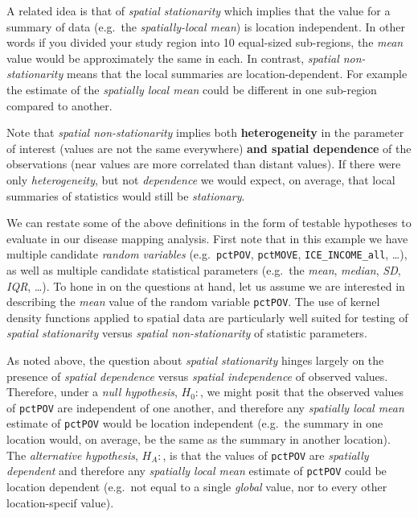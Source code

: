 \documentclass[
]{book}
\begin{document}
A related idea is that of \emph{spatial stationarity} which implies that the value for a summary of data (e.g.~the \emph{spatially-local mean}) is location independent. In other words if you divided your study region into 10 equal-sized sub-regions, the \emph{mean} value would be approximately the same in each. In contrast, \emph{spatial non-stationarity} means that the local summaries are location-dependent. For example the estimate of the \emph{spatially local mean} could be different in one sub-region compared to another.

Note that \emph{spatial non-stationarity} implies both \textbf{heterogeneity} in the parameter of interest (values are not the same everywhere) \textbf{and spatial dependence} of the observations (near values are more correlated than distant values). If there were only \emph{heterogeneity}, but not \emph{dependence} we would expect, on average, that local summaries of statistics would still be \emph{stationary}.

We can restate some of the above definitions in the form of testable hypotheses to evaluate in our disease mapping analysis. First note that in this example we have multiple candidate \emph{random variables} (e.g.~\texttt{pctPOV}, \texttt{pctMOVE}, \texttt{ICE\_INCOME\_all}, \ldots), as well as multiple candidate statistical parameters (e.g.~the \emph{mean}, \emph{median}, \emph{SD}, \emph{IQR}, \ldots). To hone in on the questions at hand, let us assume we are interested in describing the \emph{mean} value of the random variable \texttt{pctPOV}. The use of kernel density functions applied to spatial data are particularly well suited for testing of \emph{spatial stationarity} versus \emph{spatial non-stationarity} of statistic parameters.

As noted above, the question about \emph{spatial stationarity} hinges largely on the presence of \emph{spatial dependence} versus \emph{spatial independence} of observed values. Therefore, under a \emph{null hypothesis}, \(H_0:\), we might posit that the observed values of \texttt{pctPOV} are independent of one another, and therefore any \emph{spatially local mean} estimate of \texttt{pctPOV} would be location independent (e.g.~the summary in one location would, on average, be the same as the summary in another location). The \emph{alternative hypothesis}, \(H_A:\), is that the values of \texttt{pctPOV} are \emph{spatially dependent} and therefore any \emph{spatially local mean} estimate of \texttt{pctPOV} could be location dependent (e.g.~not equal to a single \emph{global} value, nor to every other location-specif value).
\end{document}

